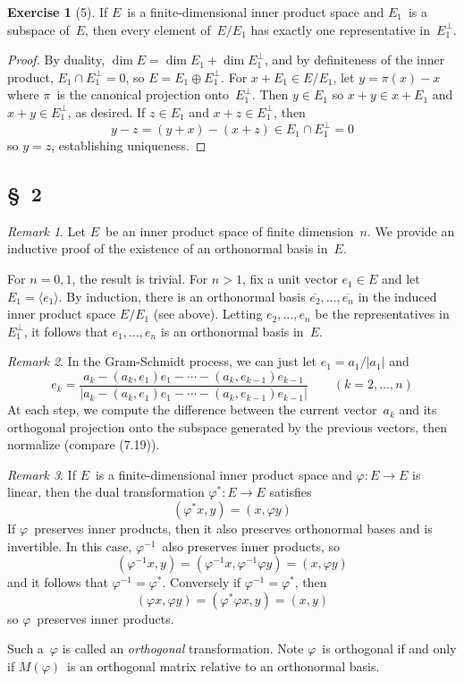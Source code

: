 \documentclass[letterpaper,12pt]{article}
\newcommand{\sect}{\cap}
\newcommand{\dsum}{\oplus}
\newcommand{\gen}[1]{\langle#1\rangle}
\newcommand{\oc}[1]{#1^{\perp}}
\newcommand{\iprod}[2]{(#1,#2)}
\newcommand{\norm}[1]{|#1|}
\newcommand{\proj}[1]{\overline{#1}}
\theoremstyle{definition}
\newtheorem*{exer}{Exercise}
\theoremstyle{remark}
\newtheorem*{rmk}{Remark}
\begin{document}
\begin{exer}[5]
If \(E\)~is a finite-dimensional inner product space and \(E_1\)~is a subspace of~\(E\), then every element of~\(E/E_1\) has exactly one representative in~\(\oc{E_1}\).
\end{exer}
\begin{proof}
By duality, \(\dim E=\dim E_1+\dim\oc{E_1}\), and by definiteness of the inner product, \(E_1\sect\oc{E_1}=0\), so \(E=E_1\dsum\oc{E_1}\). For \(x+E_1\in E/E_1\), let \(y=\pi(x)-x\) where \(\pi\)~is the canonical projection onto~\(\oc{E_1}\). Then \(y\in E_1\) so \(x+y\in x+E_1\) and \(x+y\in\oc{E_1}\), as desired. If \(z\in E_1\) and \(x+z\in\oc{E_1}\), then
\[y-z=(y+x)-(x+z)\in E_1\sect\oc{E_1}=0\]
so \(y=z\), establishing uniqueness.
\end{proof}

\subsection*{\S~2}
\begin{rmk}
Let \(E\)~be an inner product space of finite dimension~\(n\). We provide an inductive proof of the existence of an orthonormal basis in~\(E\).

For \(n=0,1\), the result is trivial. For \(n>1\), fix a unit vector \(e_1\in E\) and let \(E_1=\gen{e_1}\). By induction, there is an orthonormal basis \(\proj{e_2},\ldots,\proj{e_n}\) in the induced inner product space \(E/E_1\) (see above). Letting \(e_2,\ldots,e_n\) be the representatives in~\(\oc{E_1}\), it follows that \(e_1,\ldots,e_n\) is an orthonormal basis in~\(E\).
\end{rmk}

\begin{rmk}
In the Gram-Schmidt process, we can just let \(e_1=a_1/\norm{a_1}\) and
\[e_k=\frac{a_k-\iprod{a_k}{e_1}e_1-\cdots-\iprod{a_k}{e_{k-1}}e_{k-1}}{\norm{a_k-\iprod{a_k}{e_1}e_1-\cdots-\iprod{a_k}{e_{k-1}}e_{k-1}}}\qquad(k=2,\ldots,n)\]
At each step, we compute the difference between the current vector~\(a_k\) and its orthogonal projection onto the subspace generated by the previous vectors, then normalize (compare (7.19)).
\end{rmk}

\begin{rmk}
If \(E\)~is a finite-dimensional inner product space and \(\varphi:E\to E\) is linear, then the dual transformation \(\varphi^*:E\to E\) satisfies
\[\iprod{\varphi^* x}{y}=\iprod{x}{\varphi y}\]
If \(\varphi\)~preserves inner products, then it also preserves orthonormal bases and is invertible. In this case, \(\varphi^{-1}\)~also preserves inner products, so
\[\iprod{\varphi^{-1}x}{y}=\iprod{\varphi^{-1}x}{\varphi^{-1}\varphi y}=\iprod{x}{\varphi y}\]
and it follows that \(\varphi^{-1}=\varphi^*\). Conversely if \(\varphi^{-1}=\varphi^*\), then
\[\iprod{\varphi x}{\varphi y}=\iprod{\varphi^*\varphi x}{y}=\iprod{x}{y}\]
so \(\varphi\)~preserves inner products.

Such a~\(\varphi\) is called an \emph{orthogonal} transformation. Note \(\varphi\)~is orthogonal if and only if \(M(\varphi)\)~is an orthogonal matrix relative to an orthonormal basis.
\end{rmk}
\end{document}
